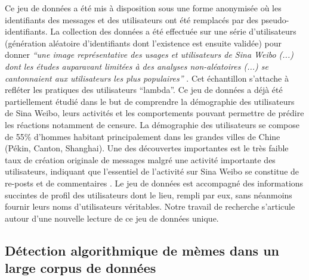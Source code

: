 Ce jeu de données a été mis à disposition sous une forme anonymisée o\`u les identifiants des messages et des utilisateurs ont été remplacés par des pseudo-identifiants. La collection des données a été effectuée sur une série d{\textquoteright}utilisateurs (génération aléatoire d{\textquoteright}identifiants dont l{\textquoteright}existence est ensuite validée) pour donner \textit{{\textquotedblleft}une image représentative des usages et utilisateurs de Sina Weibo (...) dont les études auparavant limitées à des analyses non-aléatoires (...) se cantonnaient aux utilisateurs les plus populaires{\textquotedblright} }\citep{Fu2013}. Cet échantillon s{\textquoteright}attache à refléter les pratiques des utilisateurs {\textquotedblleft}lambda{\textquotedblright}. Ce jeu de données a déjà été partiellement étudié dans le but de comprendre la démographie des utilisateurs de Sina Weibo, leurs activités et les comportements pouvant permettre de prédire les réactions notamment de censure. La démographie des utilisateurs se compose de 55\% d{\textquoteright}hommes habitant principalement dans les grandes villes de Chine (Pékin, Canton, Shanghai). Une des découvertes importantes est le très faible taux de création originale de messages malgré une activité importante des utilisateurs, indiquant que l{\textquoteright}essentiel de l{\textquoteright}activité sur Sina Weibo se constitue de re-posts et de commentaires \citep{Fu2013}. Le jeu de données est accompagné des informations succintes de profil des utilisateurs dont le lieu, rempli par eux, sans néanmoins fournir leurs noms d{\textquoteright}utilisateurs véritables. Notre travail de recherche s{\textquoteright}articule autour d{\textquoteright}une nouvelle lecture de ce jeu de données unique.

\subsection[Détection algorithmique de mèmes]{Détection algorithmique de mèmes dans un large corpus de données}
\label{sec:protomemes}

